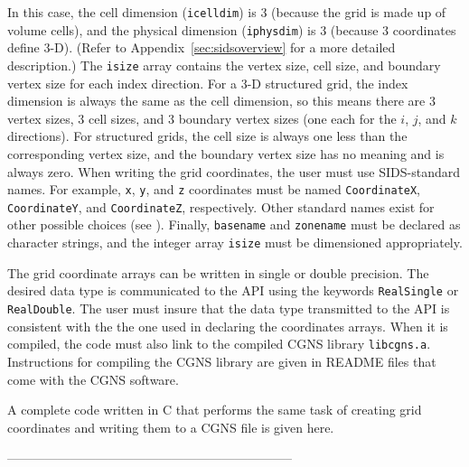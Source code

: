 \documentclass[12pt]{article}
\begin{document}
In this case, the cell dimension ({\tt icelldim}) is 3
(because the grid is made up of volume cells), and the
physical dimension ({\tt iphysdim}) is 3 (because 3 coordinates
define 3-D).  (Refer to Appendix~\ref{sec:sidsoverview} for a more
detailed description.)  The {\tt isize} array
contains the vertex size, cell size, and
boundary vertex size for each index direction.  For a 3-D
structured grid, the index dimension is always the same as
the cell dimension, so this
means there are 3 vertex sizes, 3 cell sizes, and 3 boundary vertex sizes
(one each for the $i$, $j$, and $k$ directions).  For structured grids, 
the cell size is always one less than the corresponding vertex
size, and the boundary vertex size has no meaning and is always zero.
When writing the grid coordinates, the user must use SIDS-standard
names.  For example, {\tt x}, {\tt y}, and {\tt z} coordinates must be named
{\tt CoordinateX}, {\tt CoordinateY}, and {\tt CoordinateZ},
respectively.  Other standard names exist for other possible choices
(see \cite{ALLMARAS}).
Finally, {\tt basename} and {\tt zonename} must be declared as character
strings, and the integer array {\tt isize} must be dimensioned
appropriately.

The grid coordinate arrays can be written in single or double
precision.  The desired data type is communicated to the API using the
keywords {\tt RealSingle} or {\tt RealDouble}.  The user must
insure that the data type transmitted to the API is consistent with
the the one used in declaring the coordinates arrays.
When it is compiled, the code must also link to the 
compiled CGNS library {\tt libcgns.a}.
Instructions for compiling the CGNS library
are given in README files that come with the CGNS software.

A complete code written in C that performs the same task of
creating grid coordinates and writing them to a CGNS file is given here.

--------------------------------------------------------------------
\end{document}
